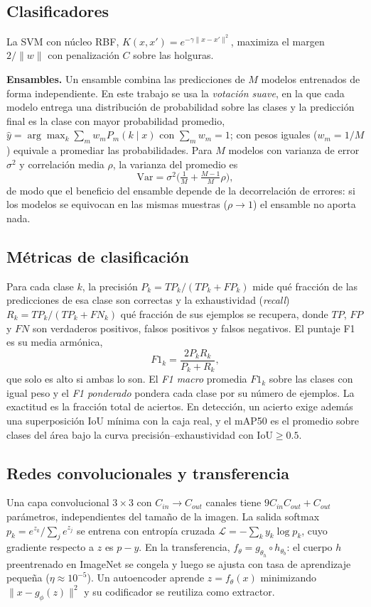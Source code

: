 \documentclass[conference]{IEEEtran}
\begin{document}
\subsection{Clasificadores}
La SVM con núcleo RBF, $K(x,x')=e^{-\gamma\|x-x'\|^2}$, maximiza el margen $2/\|w\|$ con penalización $C$ sobre las holguras.

\textbf{Ensambles.} Un ensamble combina las predicciones de $M$ modelos entrenados de forma independiente. En este trabajo se usa la \emph{votación suave}, en la que cada modelo entrega una distribución de probabilidad sobre las clases y la predicción final es la clase con mayor probabilidad promedio, $\hat y=\arg\max_k\sum_m w_m P_m(k\mid x)$ con $\sum_m w_m=1$; con pesos iguales ($w_m=1/M$) equivale a promediar las probabilidades. Para $M$ modelos con varianza de error $\sigma^2$ y correlación media $\rho$, la varianza del promedio es
\begin{equation}
\mathrm{Var}=\sigma^2\Big(\tfrac{1}{M}+\tfrac{M-1}{M}\rho\Big),
\end{equation}
de modo que el beneficio del ensamble depende de la decorrelación de errores: si los modelos se equivocan en las mismas muestras ($\rho\to1$) el ensamble no aporta nada.

\subsection{Métricas de clasificación}
Para cada clase $k$, la precisión $P_k=TP_k/(TP_k+FP_k)$ mide qué fracción de las predicciones de esa clase son correctas y la exhaustividad (\emph{recall}) $R_k=TP_k/(TP_k+FN_k)$ qué fracción de sus ejemplos se recupera, donde $TP$, $FP$ y $FN$ son verdaderos positivos, falsos positivos y falsos negativos. El puntaje F1 es su media armónica,
\begin{equation}
F1_k=\frac{2P_kR_k}{P_k+R_k},
\end{equation}
que solo es alto si ambas lo son. El \emph{F1 macro} promedia $F1_k$ sobre las clases con igual peso y el \emph{F1 ponderado} pondera cada clase por su número de ejemplos. La exactitud es la fracción total de aciertos. En detección, un acierto exige además una superposición IoU mínima con la caja real, y el mAP50 es el promedio sobre clases del área bajo la curva precisión--exhaustividad con IoU$\ge0.5$.

\subsection{Redes convolucionales y transferencia}
Una capa convolucional $3\times3$ con $C_{in}\to C_{out}$ canales tiene $9C_{in}C_{out}+C_{out}$ parámetros, independientes del tamaño de la imagen. La salida softmax $p_k=e^{z_k}/\sum_j e^{z_j}$ se entrena con entropía cruzada $\mathcal L=-\sum_k y_k\log p_k$, cuyo gradiente respecto a $z$ es $p-y$. En la transferencia, $f_\theta=g_{\theta_h}\circ h_{\theta_b}$: el cuerpo $h$ preentrenado en ImageNet se congela y luego se ajusta con tasa de aprendizaje pequeña ($\eta\approx10^{-5}$). Un autoencoder aprende $z=f_\theta(x)$ minimizando $\|x-g_\phi(z)\|^2$ y su codificador se reutiliza como extractor.
\end{document}
